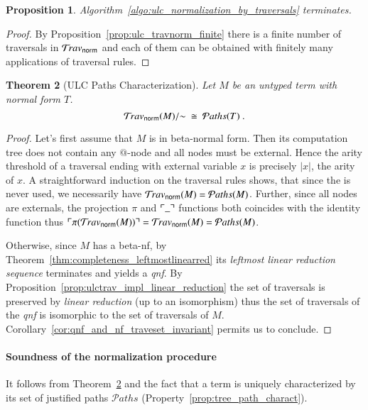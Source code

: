 \documentclass{elsarticle}
\theoremstyle{plain}
\newtheorem{theorem}{Theorem}[section]
\newtheorem{proposition}[theorem]{Proposition}
\theoremstyle{definition}
\theoremstyle{remark}
\newtheorem{remark}{Remark}[section]
\newcommand{\normalizing}{{\sf norm}}
\newcommand{\travsetnorm}{\travset_\normalizing}
\newcommand{\travulc}{\travset}
\def\coresymbol{\pi} %
\newcommand{\core}[1]{\coresymbol(#1)} %
\newcommand\pathset{{\mathcal{P}aths}} %
\begin{document}
\begin{proposition}
Algorithm~\ref{algo:ulc_normalization_by_traversals} terminates.
\end{proposition}
\begin{proof}
By Proposition~\ref{prop:ulc_travnorm_finite} there is a finite number of traversals in $\travsetnorm$ and each of them can be obtained with finitely many applications of traversal rules.
\end{proof}

\begin{theorem}[ULC Paths Characterization]
\label{thm:path_charact_ulc}
Let $M$ be an untyped term with normal form $T$.
$$\travsetnorm(M)/{\sim} \ \cong\ \pathset(T) \ .$$
\end{theorem}
\begin{proof}
Let's first assume that $M$ is in beta-normal form. Then its computation tree does not contain any $@$-node and all nodes must be external.
Hence the arity threshold of a traversal ending with external variable $x$ is precisely $|x|$, the arity of $x$. A straightforward induction on the traversal
rules shows, that since the  is never used, we necessarily have  $\travsetnorm(M) = \pathset(M)$. Further, since all nodes are externals, the projection $\coresymbol$ and $\ulcorner \_ \urcorner$ functions both coincides with the identity function thus $\pview{\core{\travsetnorm(M)}} = \travsetnorm(M) = \pathset(M)$.

Otherwise, since $M$ has a beta-nf, by Theorem~\ref{thm:completeness_leftmostlinearred} its \emph{leftmost linear reduction sequence} terminates and yields a \emph{qnf}. By Proposition~\ref{prop:ulctrav_impl_linear_reduction} the set of traversals is preserved by \emph{linear reduction} (up to an isomorphism) thus the set of traversals of the \emph{qnf} is isomorphic to the set of traversals of $M$. Corollary~\ref{cor:qnf_and_nf_traveset_invariant} permits us to conclude.
\end{proof}

\paragraph{Soundness of the normalization procedure} It follows from Theorem~\ref{thm:path_charact_ulc} and the fact that a term is uniquely characterized by its set of justified paths $\pathset$ (Property~\ref{prop:tree_path_charact}).

\end{document}
